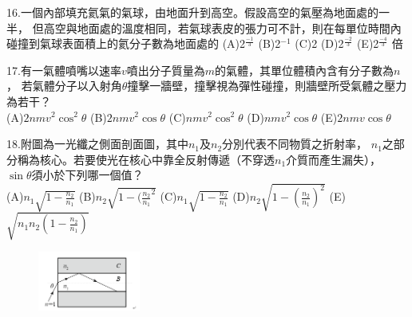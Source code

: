 \documentclass[cn,10pt,math=newtx,chinesefont=founder,device=ig]{elegantbook}
\begin{document}
\begin{example}
  16.一個內部填充氦氣的氣球，由地面升到高空。假設高空的氣壓為地面處的一半，
  但高空與地面處的溫度相同，若氣球表皮的張力可不計，則在每單位時間內碰撞到氣球表面積上的氦分子數為地面處的
(A)2$^{\frac{-1}{3}}$ (B)2$^{-1}$ (C)2 (D)2$^\frac{-2}{3}$ (E)2$^\frac{-4}{3}$ 倍
  \\
    \rightline{[成德高中教甄109]}
\end{example}
\begin{solution}
    
\end{solution}

\newpage

\begin{example}
   17.有一氣體噴嘴以速率$v$噴出分子質量為$m$的氣體，其單位體積內含有分子數為$n$，
   若氣體分子以入射角$\theta$撞擊一牆壁，撞擊視為彈性碰撞，則牆壁所受氣體之壓力為若干？\\
   (A)$2nmv^2 \cos^2{\theta}$ (B)$2nmv^2 \cos{\theta}$ (C)$nmv^2 \cos^2{\theta}$ 
   (D)$nmv^2 \cos{\theta}$ (E)$2nmv \cos{\theta}$
   \\
    \rightline{[成德高中教甄109]}
\end{example}
\begin{solution}
    
\end{solution}

\newpage

\begin{example}
   18.附圖為一光纖之側面剖面圖，其中$n_1$及$n_2$分別代表不同物質之折射率，
   $n_1$之部分稱為核心。若要使光在核心中靠全反射傳遞（不穿透$n_1$介質而產生漏失），
   $\sin{\theta}$須小於下列哪一個值？\\
   (A)$n_1 \sqrt{1-\frac{n_2}{n_1}}$ (B)$n_2 \sqrt{1-(\frac{n_2}{n_1}^2}$ 
   (C)$n_1 \sqrt{1-\frac{n_2}{n_1}}$ (D)$n_2 \sqrt{1-(\frac{n_2}{n_1})^2}$ 
   (E)$\sqrt{n_1 n_2(1-\frac{n_2}{n_1})}$
   \\
    \rightline{[成德高中教甄109]}
\end{example}
\begin{solution}
    
\end{solution}
\begin{figure}[htbp]
    \flushright
    \includegraphics[width=0.3\textwidth]{image/109成德18.png}
  \end{figure}
\newpage
\end{document}
